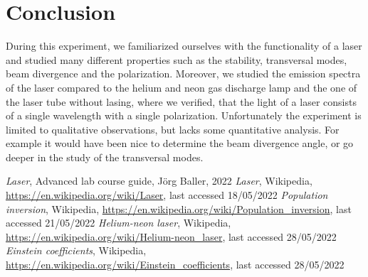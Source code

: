 \documentclass{scrartcl}
\begin{document}
\section{Conclusion}
During this experiment, we familiarized ourselves with the functionality of a laser and studied many different properties such as the stability, transversal modes, beam divergence and the polarization. Moreover, we studied the emission spectra of the laser compared to the helium and  neon gas discharge lamp and the one of the laser tube without lasing, where we verified, that the light of a laser consists of a single wavelength with a single polarization. Unfortunately the experiment is limited to qualitative observations, but lacks some quantitative analysis. For example it would have been nice to determine the beam divergence angle, or go deeper in the study of the transversal modes.

\begin{thebibliography}{}
     \textit{Laser}, Advanced lab course guide, Jörg Baller, 2022  
     \textit{Laser}, Wikipedia, \url{https://en.wikipedia.org/wiki/Laser}, last accessed 18/05/2022
     \textit{Population inversion}, Wikipedia, \url{https://en.wikipedia.org/wiki/Population_inversion}, last accessed 21/05/2022
     \textit{Helium-neon laser}, Wikipedia, \url{https://en.wikipedia.org/wiki/Helium-neon_laser}, last accessed 28/05/2022
     \textit{Einstein coefficients}, Wikipedia, \url{https://en.wikipedia.org/wiki/Einstein_coefficients}, last accessed 28/05/2022
    
\end{thebibliography}
\end{document}
